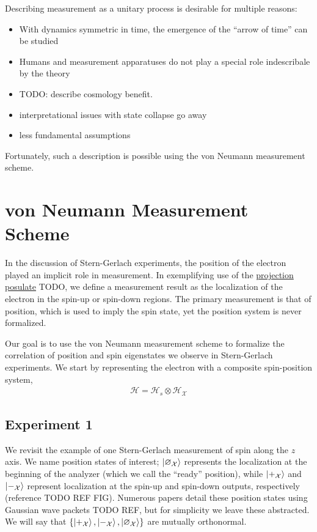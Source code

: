Describing measurement as a unitary process is desirable for multiple reasons:
\begin{itemize}
  \item With dynamics symmetric in time, the emergence of the ``arrow of time'' can be studied
  \item Humans and measurement apparatuses do not play a special role indescribale by the theory
  \item TODO: describe cosmology benefit.
  \item interpretational issues with state collapse go away
  \item less fundamental assumptions
\end{itemize}

Fortunately, such a description is possible using the von Neumann measurement scheme.

\section{von Neumann Measurement Scheme}
In the discussion of Stern-Gerlach experiments, the position of the electron played an implicit role in measurement. In exemplifying use of the \hyperref[projection postulate]{projection posulate} TODO, we define a measurement result as the localization of the electron in the spin-up or spin-down regions. The primary measurement is that of position, which is used to imply the spin state, yet the position system is never formalized.

Our goal is to use the von Neumann measurement scheme to formalize the correlation of position and spin eigenstates we observe in Stern-Gerlach experiments. We start by representing the electron with a composite spin-position system,
\begin{align}
  \mathcal{H} = \mathcal{H}_s \otimes \mathcal{H}_\mathcal{X}
\end{align}

\subsection{Experiment 1}
We revisit the example of one Stern-Gerlach measurement of spin along the $z$ axis. We name position states of interest; $\ket{\varnothing_\mathcal{X}}$ represents the localization at the beginning of the analyzer (which we call the ``ready'' position), while $\ket{+_\mathcal{X}}$ and $\ket{-_\mathcal{X}}$ represent localization at the spin-up and spin-down outputs, respectively (reference TODO REF FIG). Numerous papers detail these position states using Gaussian wave packets TODO REF, but for simplicity we leave these abstracted. We will say that $\{\ket{+_\mathcal{X}}, \ket{-_\mathcal{X}}, \ket{\varnothing_\mathcal{X}}\}$ are mutually orthonormal.

